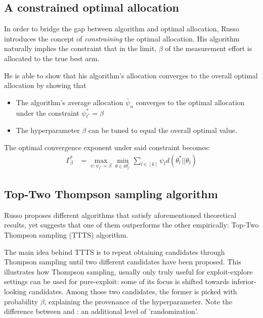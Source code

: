 \subsection{A constrained optimal allocation}

In order to bridge the gap between algorithm and optimal allocation, Russo
introduces the concept of \emph{constraining} the optimal allocation. His
algorithm naturally implies the constraint that in the limit, $\beta$ of the
measurement effort is allocated to the true best arm.

He is able to show that his algorithm's allocation converges to the overall
optimal allocation by showing that
\begin{itemize}
  \item The algorithm's average allocation $\bar{\psi}_n$ converges to the
  optimal allocation under the constraint $\psi_{l^*}^* = \beta$
  \item The hyperparameter $\beta$ can be tuned to equal the overall optimal
  value.
\end{itemize}
The optimal convergence exponent under said constraint becomes:
\begin{align}
  \Gamma^*_{\beta} &= \max_{\psi: \psi_{l^*} = \beta} \min_{\theta \in
      \Theta^c_{l^*}} \sum_{l \in [k]} \psi_l d(\theta_l^* || \theta_l)
\end{align}

\subsection{Top-Two Thompson sampling algorithm}

Russo proposes different algorithms that satisfy aforementioned theoretical
results, yet suggests that one of them outperforms the other empirically:
Top-Two Thompson sampling (TTTS) algorithm.

The main idea behind TTTS is to repeat obtaining candidates through Thompson
sampling until two different candidates have been proposed. This illustrates how
Thompson sampling, usually only truly useful for exploit-explore settings can be
used for pure-exploit: some of its focus is shifted towards inferior-looking
candidates. Among those two candidates, the former is picked with probability
$\beta$, explaining the provenance of the hyperparameter. Note the difference
between  and : an additional level of
'randomization'.

